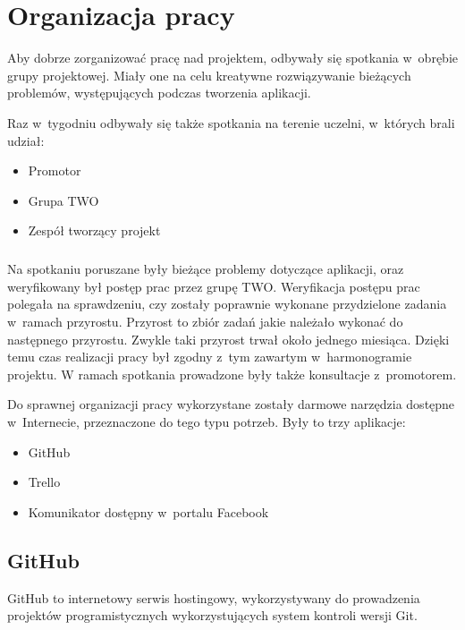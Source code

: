 \chapter{Organizacja pracy}



Aby dobrze zorganizować pracę nad projektem, odbywały się spotkania w~obrębie grupy projektowej. Miały one na celu kreatywne rozwiązywanie bieżących problemów, występujących podczas tworzenia aplikacji. 

Raz w~tygodniu odbywały się także spotkania na terenie uczelni, w~których brali udział:
\begin{itemize}
\item Promotor
\item Grupa TWO
\item Zespół tworzący projekt
\end{itemize}

\paragraph{}
Na spotkaniu poruszane były bieżące problemy dotyczące aplikacji, oraz weryfikowany był postęp prac przez grupę TWO. Weryfikacja postępu prac polegała na sprawdzeniu, czy zostały poprawnie wykonane przydzielone zadania w~ramach przyrostu. Przyrost to zbiór zadań jakie należało wykonać do następnego przyrostu. Zwykle taki przyrost trwał około jednego miesiąca. Dzięki temu czas realizacji pracy był zgodny z~tym zawartym w~harmonogramie projektu. W ramach spotkania prowadzone były także konsultacje z~promotorem.

Do sprawnej organizacji pracy wykorzystane zostały darmowe narzędzia dostępne w~Internecie, przeznaczone do tego typu potrzeb. Były to trzy aplikacje:
\begin{itemize}
\item GitHub
\item Trello
\item Komunikator dostępny w~portalu Facebook
\end{itemize}

\section{GitHub}
GitHub to internetowy serwis hostingowy, wykorzystywany do prowadzenia projektów programistycznych wykorzystujących system kontroli wersji Git. 

